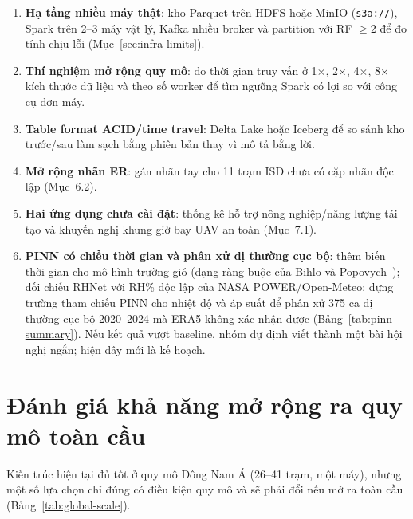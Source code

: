 \documentclass[12pt,a4paper]{report}
\begin{document}
\begin{enumerate}
    \item \textbf{Hạ tầng nhiều máy thật}: kho Parquet trên HDFS hoặc MinIO (\texttt{s3a://}), Spark trên
    2--3 máy vật lý, Kafka nhiều broker và partition với RF $\geq 2$ để đo tính chịu lỗi
    (Mục~\ref{sec:infra-limits}).
    \item \textbf{Thí nghiệm mở rộng quy mô}: đo thời gian truy vấn ở 1$\times$, 2$\times$, 4$\times$,
    8$\times$ kích thước dữ liệu và theo số worker để tìm ngưỡng Spark có lợi so với công cụ đơn máy.
    \item \textbf{Table format ACID/time travel}: Delta Lake hoặc Iceberg để so sánh kho trước/sau làm
    sạch bằng phiên bản thay vì mô tả bằng lời.
    \item \textbf{Mở rộng nhãn ER}: gán nhãn tay cho 11 trạm ISD chưa có cặp nhãn độc lập (Mục~6.2).
    \item \textbf{Hai ứng dụng chưa cài đặt}: thống kê hỗ trợ nông nghiệp/năng lượng tái tạo và khuyến
    nghị khung giờ bay UAV an toàn (Mục~7.1).
    \item \textbf{PINN có chiều thời gian và phân xử dị thường cục bộ}: thêm biến thời gian cho mô
    hình trường gió (dạng ràng buộc của Bihlo và Popovych~\cite{bihlo2022pinn}); đối chiếu RHNet
    với RH\% độc lập của NASA POWER/Open-Meteo; dựng trường tham chiếu PINN cho nhiệt độ và áp suất
    để phân xử 375 ca dị thường cục bộ 2020--2024 mà ERA5 không xác nhận được (Bảng~\ref{tab:pinn-summary}). Nếu kết quả vượt
    baseline, nhóm dự định viết thành một bài hội nghị ngắn; hiện đây mới là kế hoạch.
\end{enumerate}

\section{Đánh giá khả năng mở rộng ra quy mô toàn cầu}
\label{sec:global-scale}

Kiến trúc hiện tại đủ tốt ở quy mô Đông Nam Á (26--41 trạm, một máy), nhưng một số lựa chọn chỉ đúng
có điều kiện quy mô và sẽ phải đổi nếu mở ra toàn cầu (Bảng~\ref{tab:global-scale}).
\end{document}
